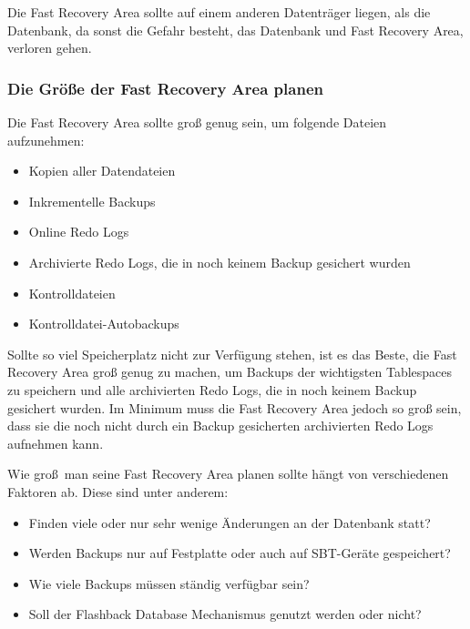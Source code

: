           Die Fast Recovery Area sollte auf einem anderen Datenträger liegen, als die Datenbank, da sonst die Gefahr besteht, das Datenbank und Fast Recovery Area, verloren gehen.
        \subsubsection{Die Größe der Fast Recovery Area planen}
          Die Fast Recovery Area sollte groß genug sein, um folgende Dateien aufzunehmen:
          \begin{itemize}
            \item Kopien aller Datendateien
            \item Inkrementelle Backups
            \item Online Redo Logs
            \item Archivierte Redo Logs, die in noch keinem Backup gesichert wurden
            \item Kontrolldateien
            \item Kontrolldatei-Autobackups
          \end{itemize}
          Sollte so viel Speicherplatz nicht zur Verfügung stehen, ist es das Beste, die Fast Recovery Area groß genug zu machen, um Backups der wichtigsten Tablespaces zu speichern und alle archivierten Redo Logs, die in noch keinem Backup gesichert wurden. Im Minimum muss die Fast Recovery Area jedoch so groß sein, dass sie die noch nicht durch ein Backup gesicherten archivierten Redo Logs aufnehmen kann.

          \begin{merke}
            Wie groß\ man seine Fast Recovery Area planen sollte hängt von verschiedenen Faktoren ab. Diese sind unter anderem:
            \begin{itemize}
              \item Finden viele oder nur sehr wenige Änderungen an der Datenbank statt?
              \item Werden Backups nur auf Festplatte oder auch auf SBT-Geräte gespeichert?
              \item Wie viele Backups müssen ständig verfügbar sein?
              \item Soll der Flashback Database Mechanismus genutzt werden oder nicht?
            \end{itemize}
          \end{merke}
